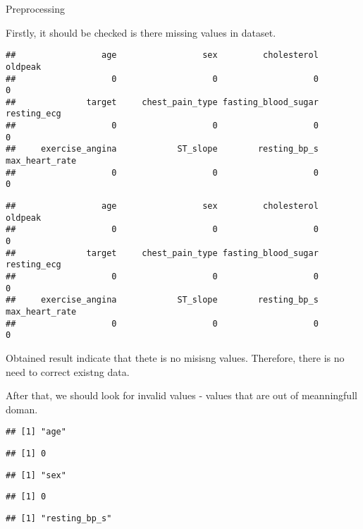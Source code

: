 \documentclass[
  ignorenonframetext,
]{beamer}
\begin{document}
\begin{frame}[fragile]{Preprocessing}
\protect\hypertarget{preprocessing}{}

Firstly, it should be checked is there missing values in dataset.

\begin{verbatim}
##                 age                 sex         cholesterol             oldpeak 
##                   0                   0                   0                   0 
##              target     chest_pain_type fasting_blood_sugar         resting_ecg 
##                   0                   0                   0                   0 
##     exercise_angina            ST_slope        resting_bp_s      max_heart_rate 
##                   0                   0                   0                   0
\end{verbatim}

\begin{verbatim}
##                 age                 sex         cholesterol             oldpeak 
##                   0                   0                   0                   0 
##              target     chest_pain_type fasting_blood_sugar         resting_ecg 
##                   0                   0                   0                   0 
##     exercise_angina            ST_slope        resting_bp_s      max_heart_rate 
##                   0                   0                   0                   0
\end{verbatim}

Obtained result indicate that thete is no misisng values. Therefore,
there is no need to correct existng data.

After that, we should look for invalid values - values that are out of
meanningfull doman.

\begin{verbatim}
## [1] "age"
\end{verbatim}

\begin{verbatim}
## [1] 0
\end{verbatim}

\begin{verbatim}
## [1] "sex"
\end{verbatim}

\begin{verbatim}
## [1] 0
\end{verbatim}

\begin{verbatim}
## [1] "resting_bp_s"
\end{verbatim}


\end{frame}
\end{document}
